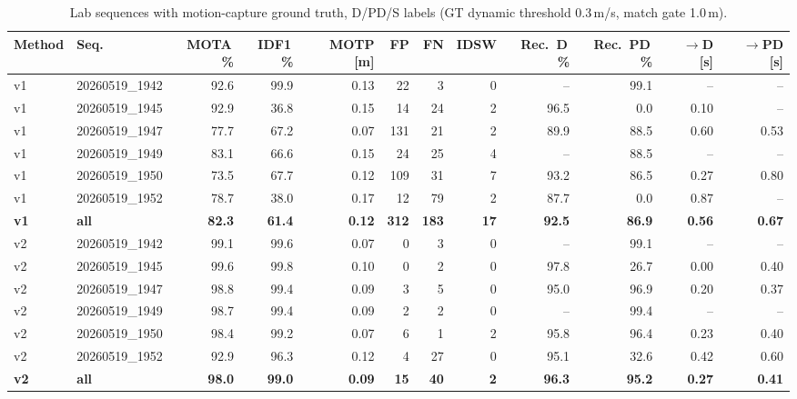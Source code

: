 \begin{table}[t]
\centering
\caption{Lab sequences with motion-capture ground truth, D/PD/S labels (GT dynamic threshold 0.3\,m/s, match gate 1.0\,m).}
\label{tab:own_r9c_full}
\setlength{\tabcolsep}{3pt}
\begin{tabular}{llrrrrrrrrrr}
\toprule
Method & Seq. & MOTA\,\% & IDF1\,\% & MOTP [m] & FP & FN & IDSW & Rec.\ D\,\% & Rec.\ PD\,\% & $\to$D [s] & $\to$PD [s] \\
\midrule
v1 & 20260519\_1942 & 92.6 & 99.9 & 0.13 & 22 & 3 & 0 & -- & 99.1 & -- & -- \\
v1 & 20260519\_1945 & 92.9 & 36.8 & 0.15 & 14 & 24 & 2 & 96.5 & 0.0 & 0.10 & -- \\
v1 & 20260519\_1947 & 77.7 & 67.2 & 0.07 & 131 & 21 & 2 & 89.9 & 88.5 & 0.60 & 0.53 \\
v1 & 20260519\_1949 & 83.1 & 66.6 & 0.15 & 24 & 25 & 4 & -- & 88.5 & -- & -- \\
v1 & 20260519\_1950 & 73.5 & 67.7 & 0.12 & 109 & 31 & 7 & 93.2 & 86.5 & 0.27 & 0.80 \\
v1 & 20260519\_1952 & 78.7 & 38.0 & 0.17 & 12 & 79 & 2 & 87.7 & 0.0 & 0.87 & -- \\
\textbf{v1} & \textbf{all} & \textbf{82.3} & \textbf{61.4} & \textbf{0.12} & \textbf{312} & \textbf{183} & \textbf{17} & \textbf{92.5} & \textbf{86.9} & \textbf{0.56} & \textbf{0.67} \\
\midrule
v2 & 20260519\_1942 & 99.1 & 99.6 & 0.07 & 0 & 3 & 0 & -- & 99.1 & -- & -- \\
v2 & 20260519\_1945 & 99.6 & 99.8 & 0.10 & 0 & 2 & 0 & 97.8 & 26.7 & 0.00 & 0.40 \\
v2 & 20260519\_1947 & 98.8 & 99.4 & 0.09 & 3 & 5 & 0 & 95.0 & 96.9 & 0.20 & 0.37 \\
v2 & 20260519\_1949 & 98.7 & 99.4 & 0.09 & 2 & 2 & 0 & -- & 99.4 & -- & -- \\
v2 & 20260519\_1950 & 98.4 & 99.2 & 0.07 & 6 & 1 & 2 & 95.8 & 96.4 & 0.23 & 0.40 \\
v2 & 20260519\_1952 & 92.9 & 96.3 & 0.12 & 4 & 27 & 0 & 95.1 & 32.6 & 0.42 & 0.60 \\
\textbf{v2} & \textbf{all} & \textbf{98.0} & \textbf{99.0} & \textbf{0.09} & \textbf{15} & \textbf{40} & \textbf{2} & \textbf{96.3} & \textbf{95.2} & \textbf{0.27} & \textbf{0.41} \\
\bottomrule
\end{tabular}
\end{table}
